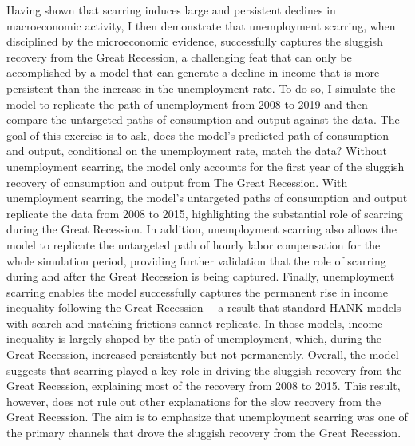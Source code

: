 Having shown that scarring induces large and persistent declines in macroeconomic activity, I then demonstrate that unemployment scarring, when disciplined by the microeconomic evidence, successfully captures the sluggish recovery from the Great Recession, a challenging feat that can only be accomplished by a model that can generate a decline in income that is more persistent than the increase in the unemployment rate. To do so, I simulate the model to replicate the path of unemployment from 2008 to 2019 and then compare the untargeted paths of consumption and output against the data. The goal of this exercise is to ask, does the model's predicted path of consumption and output, conditional on the unemployment rate, match the data? Without unemployment scarring, the model only accounts for the first year of the sluggish recovery of consumption and output from The Great Recession. With unemployment scarring, the model's untargeted paths of consumption and output replicate the data from 2008 to 2015, highlighting the substantial role of scarring during the Great Recession. In addition, unemployment scarring also allows the model to replicate the untargeted path of hourly labor compensation for the whole simulation period, providing further validation that the role of scarring during and after the Great Recession is being captured. Finally, unemployment scarring enables the model successfully captures the permanent rise in income inequality following the Great Recession ---a result that standard HANK models with search and matching frictions cannot replicate. In those models, income inequality is largely shaped by the path of unemployment, which, during the Great Recession, increased persistently but not permanently. Overall, the model suggests that scarring played a key role in driving the sluggish recovery from the Great Recession, explaining most of the recovery from 2008 to 2015. This result, however, does not rule out other explanations for the slow recovery from the Great Recession. The aim is to emphasize that unemployment scarring was one of the primary channels that drove the sluggish recovery from the Great Recession.

